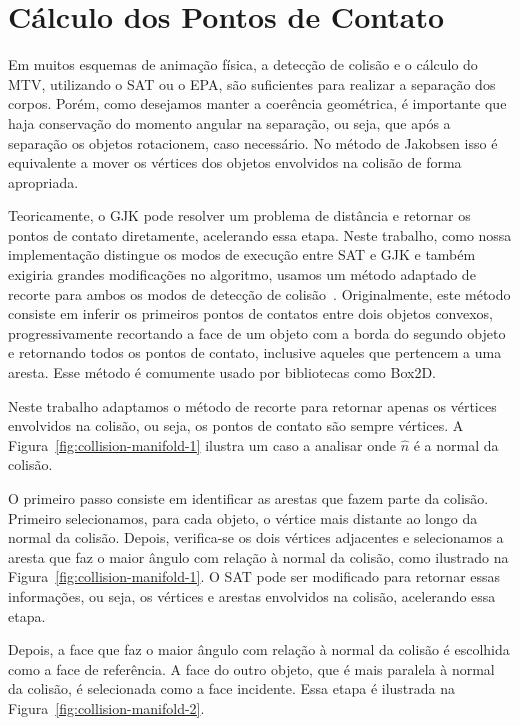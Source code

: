 \section{Cálculo dos Pontos de Contato}

Em muitos esquemas de animação física, a detecção de colisão e o cálculo do MTV, utilizando o SAT ou o EPA, são suficientes para realizar a separação dos corpos. Porém, como desejamos manter a coerência geométrica, é importante que haja conservação do momento angular na separação, ou seja, que após a separação os objetos rotacionem, caso necessário. No método de Jakobsen isso é equivalente a mover os vértices dos objetos envolvidos na colisão de forma apropriada. 

Teoricamente, o GJK pode resolver um problema de distância e retornar os pontos de contato diretamente, acelerando essa etapa. Neste trabalho, como nossa implementação distingue os modos de execução entre SAT e GJK e também exigiria grandes modificações no algoritmo, usamos um método adaptado de recorte para ambos os modos de detecção de colisão~\cite{collision_manifolds_2017, dyn4j_clipping_2011}. Originalmente, este método consiste em inferir os primeiros pontos de contatos entre dois objetos convexos, progressivamente recortando a face de um objeto com a borda do segundo objeto e retornando todos os pontos de contato, inclusive aqueles que pertencem a uma aresta. Esse método é comumente usado por bibliotecas como Box2D. 

Neste trabalho adaptamos o método de recorte para retornar apenas os vértices envolvidos na colisão, ou seja, os pontos de contato são sempre vértices. A Figura~\ref{fig:collision-manifold-1} ilustra um caso a analisar onde $\hat n$ é a normal da colisão. 

O primeiro passo consiste em identificar as arestas que fazem parte da colisão. Primeiro selecionamos, para cada objeto, o vértice mais distante ao longo da normal da colisão. Depois, verifica-se os dois vértices adjacentes e selecionamos a aresta que faz o maior ângulo com relação à normal da colisão, como ilustrado na Figura~\ref{fig:collision-manifold-1}. O SAT pode ser modificado para retornar essas informações, ou seja, os vértices e arestas envolvidos na colisão, acelerando essa etapa.

Depois, a face que faz o maior ângulo com relação à normal da colisão é escolhida como a face de referência. A face do outro objeto, que é mais paralela à normal da colisão, é selecionada como a face incidente. Essa etapa é ilustrada na Figura~\ref{fig:collision-manifold-2}. 

